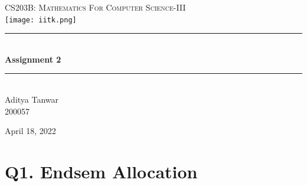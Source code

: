 \documentclass[12pt,titlepage]{report}
\begin{document}
\begin{titlepage}
\newcommand{\HRule}{\rule{\linewidth}{0.5mm}}
\center
\textsc{\LARGE
CS203B: Mathematics For Computer Science-III
} \\[1cm]
\texttt{[image: iitk.png]} \\[1cm]
\HRule \\[0.4cm]
{ \huge \bfseries Assignment 2 \\[0.15cm] }
\HRule \\[2.5cm]
{\centering
\Large Aditya Tanwar\\[0.5cm]
\Large 200057}

\null\vspace{2cm}
\Large April 18, 2022 \\ [1cm]

\end{titlepage}

\newpage

\newcommand{\ans}[1]{\colorbox{boxgreen}{\color{ForestGreen} #1}}
\newcommand{\loclink}[2]{\hyperlink{#1}{\color{NavyBlue} #2}}
\newcommand{\comment}[1]{&\pushright{\color{Gray} #1}}
\renewcommand{\o}[1]{$\mathcal{O}(#1)$}


\newpage

\section*{\hypertarget{q1}{Q1. Endsem Allocation}}
\end{document}
